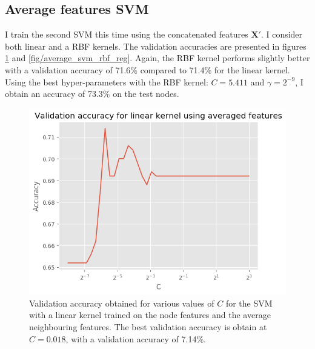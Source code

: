 \documentclass[12pt]{article}
\theoremstyle{definition}
\begin{document}
\subsection{Average features SVM}
I train the second SVM this time using the concatenated features $\mathbf{X}'$. I consider both linear and a RBF kernels. The validation accuracies are presented in figures \ref{fig/average_svm_linear_reg} and \ref{fig/average_svm_rbf_reg}. Again, the RBF kernel performs slightly better with a validation accuracy of 71.6\% compared to 71.4\% for the linear kernel. Using the best hyper-parameters with the RBF kernel: $C=5.411$ and $\gamma = 2^{-9}$, I obtain an accuracy of 73.3\% on the test nodes.

\begin{figure}[h]
	\includegraphics[width=1.0\textwidth]{average_svm/linear_reg}
	\centering
	\caption{Validation accuracy obtained for various values of $C$ for the SVM with a linear kernel trained on the node features and the average neighbouring features. The best validation accuracy is obtain at $C=0.018$, with a validation accuracy of 7.14\%.}
	\label{fig/average_svm_linear_reg}
\end{figure}
\end{document}
